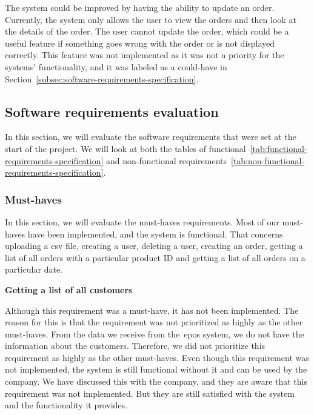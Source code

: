 \noindent
The system could be improved by having the ability to update an order.
Currently, the system only allows the user to view the orders and then look at the details of the order.
The user cannot update the order, which could be a useful feature if something goes wrong with the order or is not
displayed correctly.
This feature was not implemented as it was not a priority for the systems' functionality, and it was labeled as a
could-have in Section~\ref{subsec:software-requirements-specification}.

\subsection{Software requirements evaluation}\label{subsec:software-requirements-evaluation}

In this section, we will evaluate the software requirements that were set at the start of the project.
We will look at both the tables of functional~\ref{tab:functional-requirements-specification}
and non-functional requirements~\ref{tab:non-functional-requirements-specification}.

\subsubsection{Must-haves}\label{subsubsec:must-haves}

In this section, we will evaluate the must-haves requirements.
Most of our must-haves have been implemented, and the system is functional.
That concerns uploading a csv file, creating a user, deleting a user, creating an order, getting a list of all orders
with a particular product ID and getting a list of all orders on a particular date.
\newline

\noindent
\textbf{Getting a list of all customers}\label{text:getting-a-list-of-all-customers}

\noindent
Although this requirement was a must-have, it has not been implemented.
The reason for this is that the requirement was not prioritized as highly as the other must-haves.
From the data we receive from the~\acrshort{epos} system, we do not have the information about the customers.
Therefore, we did not prioritize this requirement as highly as the other must-haves.
Even though this requirement was not implemented, the system is still functional without it and can be used by the
company. %
We have discussed this with the company, and they are aware that this requirement was not implemented.
But they are still satisfied with the system and the functionality it provides.

